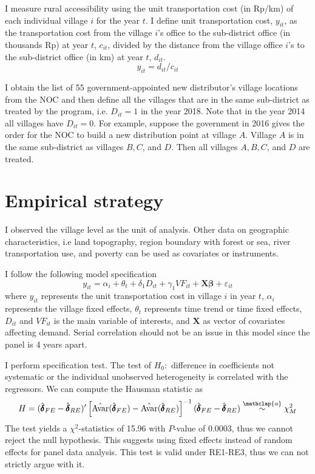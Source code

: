 \documentclass[letterpaper,12pt,leqno]{article}
\newcommand\asym{\stackrel{\mathclap{a}}{\sim}}
\newcommand{\Av}{\text{Avar}}
\begin{document}
I measure rural accessibility using the unit transportation cost (in Rp/km) of each individual village $i$ for the year $t$. I define unit transportation cost, $y_{it}$, as the transportation cost from the village $i$'s office to the sub-district office (in thousands Rp) at year $t$, $c_{it}$, divided by the distance from the village office $i$'s to the sub-district office (in km) at year $t$, $d_{it}$.
\begin{equation}
        y_{it}=d_{it}/c_{it}    
\end{equation}

I obtain the list of 55 government-appointed new distributor's village locations from the NOC and then define all the villages that are in the same sub-district as treated by the program, i.e. $D_{it}=1$ in the year 2018. Note that in the year 2014 all villages have $D_{it}=0$. For example, suppose the government in 2016 gives the order for the NOC to build a new distribution point at village $A$. Village $A$ is in the same sub-district as villages $B,C$, and $D$. Then all villages $A,B,C$, and $D$ are treated.


\section{Empirical strategy}\label{s:strategy}

I observed the village level as the unit of analysis. Other data on geographic characteristics, i.e land topography, region boundary with forest or sea, river transportation use, and poverty can be used as covariates or instruments.

I follow the following model specification
\begin{equation}
    y_{it}=\alpha_i+\theta_t+\delta_1 D_{it}+\gamma_1 VF_{it}+\textbf{X}\pmb{\beta}+\varepsilon_{it}\label{e1}
\end{equation}
where $y_{it}$ represents the unit transportation cost in village $i$ in year $t$,
$\alpha_i$ represents the village fixed effects, $\theta_t$ represents time trend or time fixed effects, $D_{it}$ and $VF_{it}$ is the main variable of interests, and $\textbf{X}$ as vector of covariates affecting demand. Serial correlation should not be an issue in this model since the panel is 4 years apart. 

I perform \citet{hausman78} specification test. The test of $H_0:$ difference in coefficients not systematic or the individual unobserved heterogeneity is correlated with the regressors. We can compute the Hausman statistic as \begin{equation*}
        H=(\hat{\pmb{\delta}}_{FE}-\hat{\pmb{\delta}}_{RE})'\left[\hat{\Av}(\hat{\pmb{\delta}}_{FE})-\hat{\Av}(\hat{\pmb{\delta}}_{RE})\right]^{-1}(\hat{\pmb{\delta}}_{FE}-\hat{\pmb{\delta}}_{RE}) \asym \chi_M^2 \end{equation*}
The test yields a $\chi^2$-statistics of 15.96 with $P$-value of 0.0003, thus we cannot reject the null hypothesis. This suggests using fixed effects instead of random effects for panel data analysis. This test is valid under RE1-RE3, thus we can not strictly argue with it.
\end{document}
